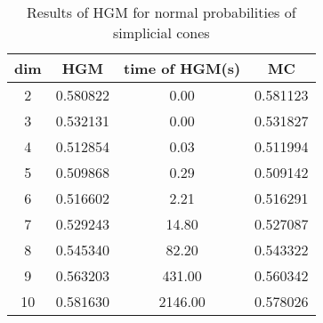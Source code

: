 \begin{table}[htbp]
\begin{center}
\begin{tabular}{cccc}
dim& HGM & time of HGM(s) & MC\\
\hline
2 & 0.580822 & 0.00 & 0.581123\\
3 & 0.532131 & 0.00 & 0.531827\\
4 & 0.512854 & 0.03 & 0.511994\\
5 & 0.509868 & 0.29 & 0.509142\\
6 & 0.516602 & 2.21 & 0.516291\\
7 & 0.529243 & 14.80 & 0.527087\\
8 & 0.545340 & 82.20 & 0.543322\\
9 & 0.563203 & 431.00 & 0.560342\\
10 & 0.581630 & 2146.00 & 0.578026\\
\hline
\end{tabular}
\end{center}
\caption{Results of HGM for normal probabilities of simplicial cones}
\label{tab2}
\end{table}
